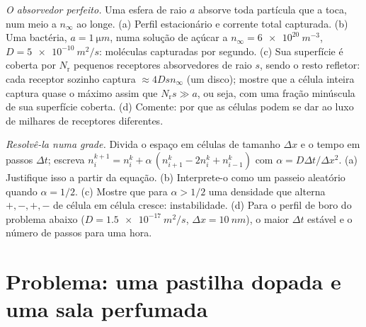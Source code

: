 \begin{exercise}[$\star\star\star$]\label{exo:b2:particle-diffusion:11}
\emph{O absorvedor perfeito.} Uma esfera de raio $a$ absorve toda
partícula que a toca, num meio a $n_\infty$ ao longe. (a)
Perfil estacionário e corrente total capturada. (b) Uma bactéria, $a =
\qty{1}{\micro m}$, numa solução de açúcar a $n_\infty = \qty{6e20}{m^{-3}}$,
$D = \qty{5e-10}{m^2/s}$: moléculas capturadas por segundo. (c) Sua
superfície é coberta por $N_{\text{r}}$ pequenos receptores absorvedores de
raio $s$, sendo o resto refletor: cada receptor sozinho captura $\approx
4Ds n_\infty$ (um disco); mostre que a célula inteira captura quase o
máximo assim que $N_{\text{r}} s \gg a$, ou seja, com uma fração minúscula de sua
superfície coberta. (d) Comente: por que as células podem se dar ao luxo de milhares de
receptores diferentes.
\end{exercise}

\begin{exercise}[$\star\star\star$]\label{exo:b2:particle-diffusion:12}
\emph{Resolvê-la numa grade.} Divida o espaço em células de tamanho $\Delta x$
e o tempo em passos $\Delta t$; escreva $n_i^{k+1} = n_i^k + \alpha\,(n_{i+1}^k
- 2n_i^k + n_{i-1}^k)$ com $\alpha = D\Delta t/\Delta x^2$. (a) Justifique
isso a partir da equação. (b) Interprete-o como um passeio aleatório quando $\alpha =
1/2$. (c) Mostre que para $\alpha > 1/2$ uma densidade que alterna $+,-,+,-$
de célula em célula cresce: instabilidade. (d) Para o perfil de boro do
problema abaixo ($D = \qty{1.5e-17}{m^2/s}$, $\Delta x = \qty{10}{nm}$),
o maior $\Delta t$ estável e o número de passos para uma hora.
\end{exercise}

\section{Problema: uma pastilha dopada e uma sala perfumada}

